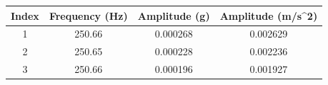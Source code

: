 \begin{tabular}{cccc}
\hline
Index & Frequency (Hz) & Amplitude (g) & Amplitude (m/s^2) \\
\hline
1 & 250.66 & 0.000268 & 0.002629 \\
2 & 250.65 & 0.000228 & 0.002236 \\
3 & 250.66 & 0.000196 & 0.001927 \\
\hline
\end{tabular}
